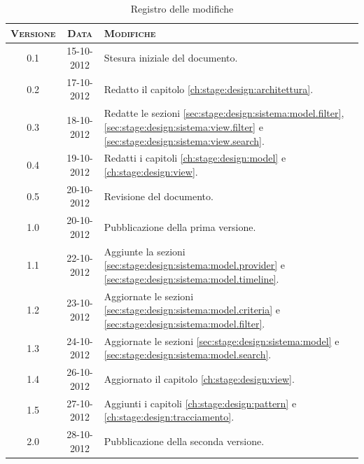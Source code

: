 \documentclass[10pt,a4paper,headinclude,footinclude,hidelinks]{scrreprt} %
\begin{document}
    \title{\rmfamily\normalfont{}}
    \author{}
    \date{\today}
    
    \maketitle
    
    \begin{abstract}
        \noindent Il documento riporta le informazioni di progettazione riguardanti l'interfaccia grafica per la visualizzazione e la navigazione dei contenuti.
    \end{abstract}
    
	\begin{table}[ht]
	\centering
	\begin{tabular}{|c|c|l|}
	\hline
	\textsc{Versione} & \textsc{Data} & \textsc{Modifiche} \\ \hline
	0.1 & 15-10-2012 & Stesura iniziale del documento. \\ \hline
	0.2 & 17-10-2012 & Redatto il capitolo \ref{ch:stage:design:architettura}. \\ \hline
	0.3 & 18-10-2012 & Redatte le sezioni \ref{sec:stage:design:sistema:model.filter}, \ref{sec:stage:design:sistema:view.filter} e \ref{sec:stage:design:sistema:view.search}. \\ \hline
	0.4 & 19-10-2012 & Redatti i capitoli \ref{ch:stage:design:model} e \ref{ch:stage:design:view}. \\ \hline
	0.5 & 20-10-2012 & Revisione del documento. \\ \hline
	1.0 & 20-10-2012 & Pubblicazione della prima versione. \\ \hline
	1.1 & 22-10-2012 & Aggiunte la sezioni \ref{sec:stage:design:sistema:model.provider} e \ref{sec:stage:design:sistema:model.timeline}. \\ \hline
	1.2 & 23-10-2012 & Aggiornate le sezioni \ref{sec:stage:design:sistema:model.criteria} e \ref{sec:stage:design:sistema:model.filter}. \\ \hline
	1.3 & 24-10-2012 & Aggiornate le sezioni \ref{sec:stage:design:sistema:model} e \ref{sec:stage:design:sistema:model.search}. \\ \hline
	1.4 & 26-10-2012 & Aggiornato il capitolo \ref{ch:stage:design:view}. \\ \hline
	1.5 & 27-10-2012 & Aggiunti i capitoli \ref{ch:stage:design:pattern} e \ref{ch:stage:design:tracciamento}. \\ \hline
	2.0 & 28-10-2012 & Pubblicazione della seconda versione. \\ \hline
	\end{tabular}
	\caption{Registro delle modifiche}
	\label{tab:stage:wp:workload}
	\end{table}
\end{document}
